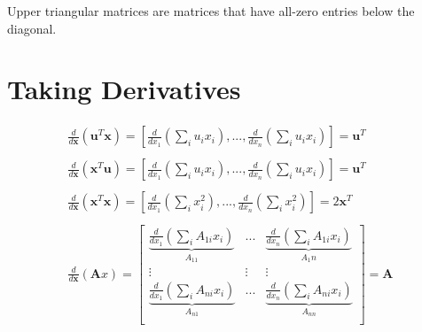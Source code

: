 Upper triangular matrices are matrices that have all-zero entries below the diagonal.

\section{Taking Derivatives}

\begin{equation}
\begin{array}{l}
\frac{d}{d\mathbf{x}} \left(\mathbf{u}^T\mathbf{x}\right) = \left[\frac{d}{dx_1}\left(\sum_i u_i x_i\right),...,\frac{d}{dx_n}\left(\sum_i u_i x_i\right)\right] = \mathbf{u}^T\\
\\
\frac{d}{d\mathbf{x}} \left(\mathbf{x}^T\mathbf{u}\right) = \left[\frac{d}{dx_1}\left(\sum_i u_i x_i\right),...,\frac{d}{dx_n}\left(\sum_i u_i x_i\right)\right] = \mathbf{u}^T\\
\\
\frac{d}{d\mathbf{x}} \left(\mathbf{x}^T\mathbf{x}\right) = \left[\frac{d}{dx_1}\left(\sum_i x_i^2\right),...,\frac{d}{dx_n}\left(\sum_i x_i^2\right)\right] = 2\mathbf{x}^T\\
\\
\frac{d}{d\mathbf{x}} \left(\mathbf{A}x\right) = \left[
\begin{array}{ccc} 
\underbrace{\frac{d}{dx_1}\left(\sum_i A_{1i} x_i\right)}_{A_{11}} &...& \underbrace{\frac{d}{dx_n}\left(\sum_i A_{1i} x_i\right)}_{A_1n}\\
\vdots&\vdots&\vdots\\
\underbrace{\frac{d}{dx_1}\left(\sum_i A_{ni} x_i\right)}_{A_{n1}} &...& \underbrace{\frac{d}{dx_n}\left(\sum_i A_{ni} x_i\right)}_{A_{nn}}\\
\end{array}\right] = \mathbf{A}\\
\end{array}
\end{equation}


\chapauthor{}
